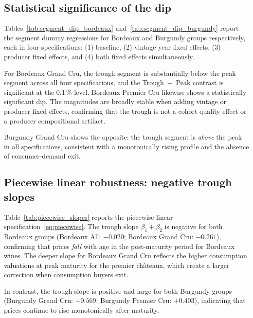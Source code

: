 \subsection{Statistical significance of the dip}

Tables~\ref{tab:segment_dip_bordeaux} and~\ref{tab:segment_dip_burgundy} report the segment
dummy regressions for Bordeaux and Burgundy groups respectively, each in four specifications:
(1) baseline, (2) vintage year fixed effects, (3) producer fixed effects, and (4) both fixed
effects simultaneously.

For Bordeaux Grand Cru, the trough segment is substantially below the peak segment across all
four specifications, and the Trough~$-$~Peak contrast is significant at the 0.1\,\% level.
Bordeaux Premier Cru likewise shows a statistically significant dip. The magnitudes are
broadly stable when adding vintage or producer fixed effects, confirming that the trough is not
a cohort quality effect or a producer compositional artifact.

Burgundy Grand Cru shows the opposite: the trough segment is \textit{above} the peak in all
specifications, consistent with a monotonically rising profile and the absence of
consumer-demand exit.





\subsection{Piecewise linear robustness: negative trough slopes}

Table~\ref{tab:piecewise_slopes} reports the piecewise linear specification~\eqref{eq:piecewise}.
The trough slope $\beta_1 + \beta_2$ is negative for both Bordeaux groups (Bordeaux All:
$-0.020$; Bordeaux Grand Cru: $-0.261$), confirming that prices \emph{fall} with age in the
post-maturity period for Bordeaux wines. The deeper slope for Bordeaux Grand Cru reflects the
higher consumption valuations at peak maturity for the premier châteaux, which create a larger
correction when consumption buyers exit.

In contrast, the trough slope is positive and large for both Burgundy groups (Burgundy Grand
Cru: $+0.569$; Burgundy Premier Cru: $+0.403$), indicating that prices continue to rise
monotonically after maturity.



